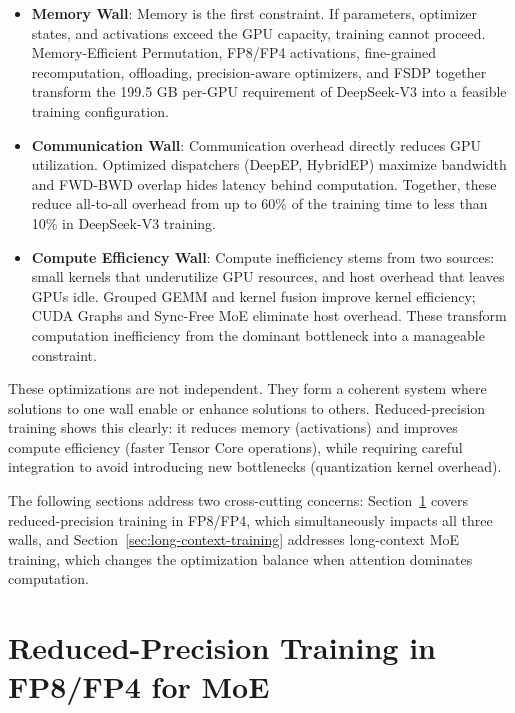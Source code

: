 \documentclass[10pt,logo,copyright]{nvidiatechreport}
\begin{document}
\begin{itemize}
    \item \textbf{Memory Wall}: Memory is the first constraint. If parameters, optimizer states, and activations exceed the GPU capacity, training cannot proceed. Memory-Efficient Permutation, FP8/FP4 activations, fine-grained recomputation, offloading, precision-aware optimizers, and FSDP together transform the 199.5 GB per-GPU requirement of DeepSeek-V3 into a feasible training configuration.

    \item \textbf{Communication Wall}: Communication overhead directly reduces GPU utilization. Optimized dispatchers (DeepEP, HybridEP) maximize bandwidth and FWD-BWD overlap hides latency behind computation. Together, these reduce all-to-all overhead from up to 60\% of the training time to less than 10\% in DeepSeek-V3 training.

    \item \textbf{Compute Efficiency Wall}: Compute inefficiency stems from two sources: small kernels that underutilize GPU resources, and host overhead that leaves GPUs idle. Grouped GEMM and kernel fusion improve kernel efficiency; CUDA Graphs and Sync-Free MoE eliminate host overhead. These transform computation inefficiency from the dominant bottleneck into a manageable constraint.
\end{itemize}

These optimizations are not independent. They form a coherent system where solutions to one wall enable or enhance solutions to others. Reduced-precision training shows this clearly: it reduces memory (activations) and improves compute efficiency (faster Tensor Core operations), while requiring careful integration to avoid introducing new bottlenecks (quantization kernel overhead).

The following sections address two cross-cutting concerns: Section~\ref{sec:reduced-precision-training} covers reduced-precision training in FP8/FP4, which simultaneously impacts all three walls, and Section~\ref{sec:long-context-training} addresses long-context MoE training, which changes the optimization balance when attention dominates computation.



\section{Reduced-Precision Training in FP8/FP4 for MoE}\label{sec:reduced-precision-training}
\end{document}
